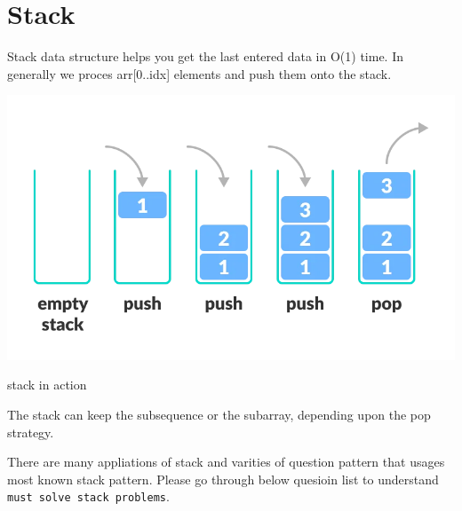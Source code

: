 \chapter{Stack}\label{chp:stack}

Stack data structure helps you get the last entered data in O(1) time.
In generally we proces arr[0..idx] elements and push them onto the stack.

\begin{marginfigure}  
\includegraphics[width=\marginparwidth]{../resources/stack_intro.png}
\caption{stack in action}
\end{marginfigure}

The stack can keep the subsequence or the subarray, depending upon the pop strategy.

There are many appliations of stack and varities of question pattern that usages most known stack pattern.
Please go through below quesioin list to understand \verb|must solve stack problems|.

